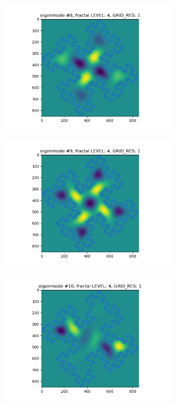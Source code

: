 \documentclass{article}
\begin{document}
\begin{figure}
\begin{subfigure}{0.3\textwidth}
        \includegraphics[width=\linewidth]{./media/eigenmode_2d8.png}
    \end{subfigure}
    \begin{subfigure}{0.3\textwidth}
        \includegraphics[width=\linewidth]{./media/eigenmode_2d9.png}
    \end{subfigure}
    \begin{subfigure}{0.3\textwidth}
        \includegraphics[width=\linewidth]{./media/eigenmode_2d10.png}

\end{subfigure}
\end{figure}
\end{document}
